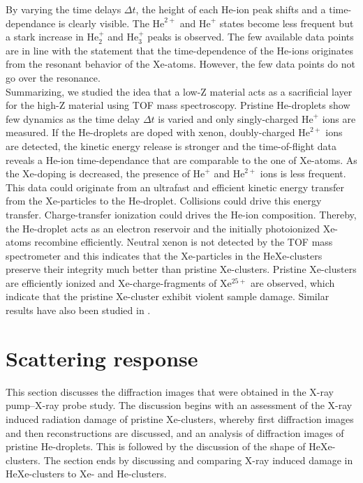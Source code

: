 By varying the time delays $\Delta t$, the height of each He-ion peak shifts and a time-dependance is clearly visible. The $\text{He}^{2+}$ and $\text{He}^{+}$ states become less frequent but a stark increase in $\text{He}_{2}^{+}$ and $\text{He}_{3}^{+}$ peaks is observed. The few available data points are in line with the statement that the time-dependence of the He-ions originates from the resonant behavior of the Xe-atoms. However, the few data points do not go over the resonance.\\[1\baselineskip]
%
Summarizing, we studied the idea that a low-Z material acts as a sacrificial layer for the high-Z material using TOF mass spectroscopy. Pristine He-droplets show few dynamics as the time delay $\Delta t$ is varied and only singly-charged $\text{He}^{+}$ ions are measured. If the He-droplets are doped with xenon, doubly-charged $\text{He}^{2+}$ ions are detected, the kinetic energy release is stronger and the time-of-flight data reveals a He-ion time-dependance that are comparable to the one of Xe-atoms. As the Xe-doping is decreased, the presence of $\text{He}^{+}$ and $\text{He}^{2+}$ ions is less frequent. This data could originate from an ultrafast and efficient kinetic energy transfer from the Xe-particles to the He-droplet. Collisions could drive this energy transfer. Charge-transfer ionization could drives the He-ion composition. Thereby, the He-droplet acts as an electron reservoir and the initially photoionized Xe-atoms recombine efficiently. Neutral xenon is not detected by the TOF mass spectrometer and this indicates that the Xe-particles in the HeXe-clusters preserve their integrity much better than pristine Xe-clusters. Pristine Xe-clusters are efficiently ionized and Xe-charge-fragments of Xe$^{25+}$ are observed, which indicate that the pristine Xe-cluster exhibit violent sample damage. Similar results have also been studied in \citep{Hoener-2008-JPB,Mikaberidze-2008-PRA}.
%
%
%
\section{Scattering response}
%
This section discusses the diffraction images that were obtained in the X-ray pump--X-ray probe study. The discussion begins with an assessment of the X-ray induced radiation damage of pristine Xe-clusters, whereby first diffraction images and then reconstructions are discussed, and an analysis of diffraction images of pristine He-droplets. This is followed by the discussion of the shape of HeXe-clusters. The section ends by discussing and comparing X-ray induced damage in HeXe-clusters to Xe- and He-clusters.
%
%
%
